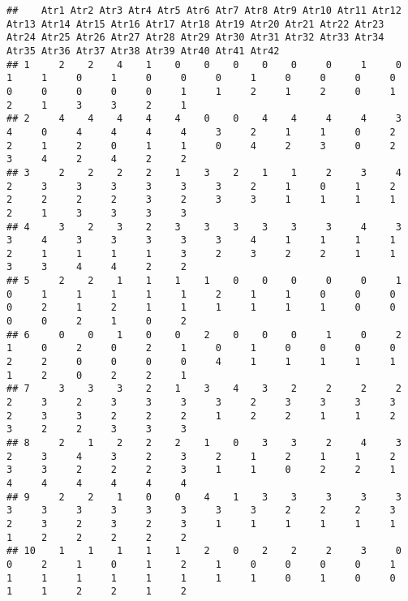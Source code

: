 \documentclass[
]{article}
\begin{document}
\begin{verbatim}
##    Atr1 Atr2 Atr3 Atr4 Atr5 Atr6 Atr7 Atr8 Atr9 Atr10 Atr11 Atr12 Atr13 Atr14 Atr15 Atr16 Atr17 Atr18 Atr19 Atr20 Atr21 Atr22 Atr23 Atr24 Atr25 Atr26 Atr27 Atr28 Atr29 Atr30 Atr31 Atr32 Atr33 Atr34 Atr35 Atr36 Atr37 Atr38 Atr39 Atr40 Atr41 Atr42
## 1     2    2    4    1    0    0    0    0    0     0     1     0     1     1     0     1     0     0     0     1     0     0     0     0     0     0     0     0     0     1     1     2     1     2     0     1     2     1     3     3     2     1
## 2     4    4    4    4    4    0    0    4    4     4     4     3     4     0     4     4     4     4     3     2     1     1     0     2     2     1     2     0     1     1     0     4     2     3     0     2     3     4     2     4     2     2
## 3     2    2    2    2    1    3    2    1    1     2     3     4     2     3     3     3     3     3     3     2     1     0     1     2     2     2     2     2     3     2     3     3     1     1     1     1     2     1     3     3     3     3
## 4     3    2    3    2    3    3    3    3    3     3     4     3     3     4     3     3     3     3     3     4     1     1     1     1     2     1     1     1     1     3     2     3     2     2     1     1     3     3     4     4     2     2
## 5     2    2    1    1    1    1    0    0    0     0     0     1     0     1     1     1     1     1     2     1     1     0     0     0     0     2     1     2     1     1     1     1     1     1     0     0     0     0     2     1     0     2
## 6     0    0    1    0    0    2    0    0    0     1     0     2     1     0     2     0     2     1     0     1     0     0     0     0     2     2     0     0     0     0     4     1     1     1     1     1     1     2     0     2     2     1
## 7     3    3    3    2    1    3    4    3    2     2     2     2     2     3     2     3     3     3     3     2     3     3     3     3     2     3     3     2     2     2     1     2     2     1     1     2     3     2     2     3     3     3
## 8     2    1    2    2    2    1    0    3    3     2     4     3     2     3     4     3     2     3     2     1     2     1     1     2     3     3     2     2     2     3     1     1     0     2     2     1     4     4     4     4     4     4
## 9     2    2    1    0    0    4    1    3    3     3     3     3     3     3     3     3     3     3     3     3     2     2     2     3     2     3     2     3     2     3     1     1     1     1     1     1     1     2     2     2     2     2
## 10    1    1    1    1    1    2    0    2    2     2     3     0     0     2     1     0     1     2     1     0     0     0     0     1     1     1     1     1     1     1     1     1     0     1     0     0     1     1     2     2     1     2

\end{verbatim}
\end{document}
